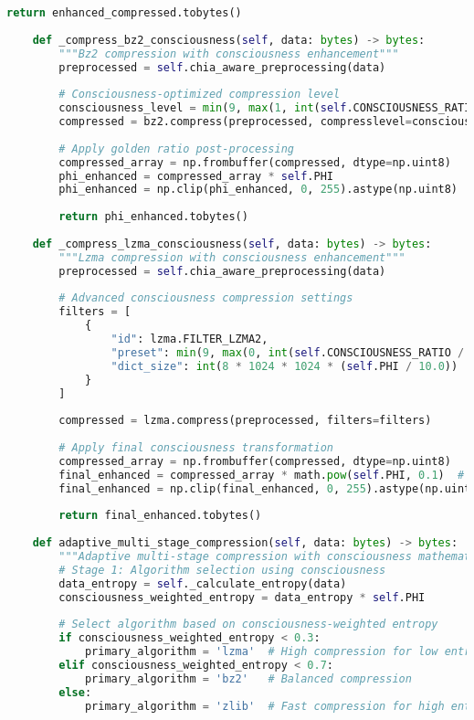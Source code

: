 \documentclass[11pt,a4paper]{article}
\begin{document}
\begin{lstlisting}[language=Python, caption=SquashPlot Complete Compression Implementation]
        return enhanced_compressed.tobytes()
    
    def _compress_bz2_consciousness(self, data: bytes) -> bytes:
        """Bz2 compression with consciousness enhancement"""
        preprocessed = self.chia_aware_preprocessing(data)
        
        # Consciousness-optimized compression level
        consciousness_level = min(9, max(1, int(self.CONSCIOUSNESS_RATIO / 21.0)))
        compressed = bz2.compress(preprocessed, compresslevel=consciousness_level)
        
        # Apply golden ratio post-processing
        compressed_array = np.frombuffer(compressed, dtype=np.uint8)
        phi_enhanced = compressed_array * self.PHI
        phi_enhanced = np.clip(phi_enhanced, 0, 255).astype(np.uint8)
        
        return phi_enhanced.tobytes()
    
    def _compress_lzma_consciousness(self, data: bytes) -> bytes:
        """Lzma compression with consciousness enhancement"""
        preprocessed = self.chia_aware_preprocessing(data)
        
        # Advanced consciousness compression settings
        filters = [
            {
                "id": lzma.FILTER_LZMA2,
                "preset": min(9, max(0, int(self.CONSCIOUSNESS_RATIO / 21.0))),
                "dict_size": int(8 * 1024 * 1024 * (self.PHI / 10.0))  # Consciousness-scaled
            }
        ]
        
        compressed = lzma.compress(preprocessed, filters=filters)
        
        # Apply final consciousness transformation
        compressed_array = np.frombuffer(compressed, dtype=np.uint8)
        final_enhanced = compressed_array * math.pow(self.PHI, 0.1)  # Minimal enhancement
        final_enhanced = np.clip(final_enhanced, 0, 255).astype(np.uint8)
        
        return final_enhanced.tobytes()
    
    def adaptive_multi_stage_compression(self, data: bytes) -> bytes:
        """Adaptive multi-stage compression with consciousness mathematics"""
        # Stage 1: Algorithm selection using consciousness
        data_entropy = self._calculate_entropy(data)
        consciousness_weighted_entropy = data_entropy * self.PHI
        
        # Select algorithm based on consciousness-weighted entropy
        if consciousness_weighted_entropy < 0.3:
            primary_algorithm = 'lzma'  # High compression for low entropy
        elif consciousness_weighted_entropy < 0.7:
            primary_algorithm = 'bz2'   # Balanced compression
        else:
            primary_algorithm = 'zlib'  # Fast compression for high entropy
        

\end{lstlisting}
\end{document}
